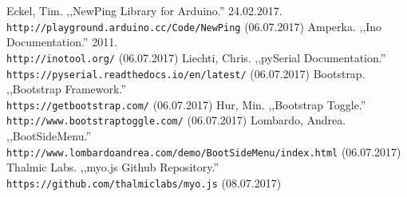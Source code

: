 \documentclass[12pt,a4paper]{report}
\begin{document}
\begin{thebibliography}{99}
Eckel, Tim. ,,NewPing Library for Arduino.'' 24.02.2017.
\\\texttt{http://playground.arduino.cc/Code/NewPing}
(06.07.2017)
Amperka. ,,Ino Documentation.'' 2011.
\\\texttt{http://inotool.org/}
(06.07.2017)
Liechti, Chris. ,,pySerial Documentation.''
\\\texttt{https://pyserial.readthedocs.io/en/latest/}
(06.07.2017)
Bootstrap. ,,Bootstrap Framework.''
\\\texttt{https://getbootstrap.com/}
(06.07.2017)
Hur, Min. ,,Bootstrap Toggle.''
\\\texttt{http://www.bootstraptoggle.com/}
(06.07.2017)
Lombardo, Andrea. ,,BootSideMenu.''
\\\texttt{http://www.lombardoandrea.com/demo/BootSideMenu/index.html}
(06.07.2017)
Thalmic Labs. ,,myo.js Github Repository.''
\\\texttt{https://github.com/thalmiclabs/myo.js}
(08.07.2017)
\end{thebibliography}
\end{document}
